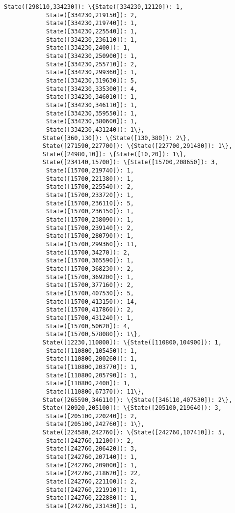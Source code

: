 \documentclass[11pt]{article}
\begin{document}
\begin{Verbatim}[commandchars=\\\{\}]
           State([298110,334230]): \{State([334230,12120]): 1,
            State([334230,219150]): 2,
            State([334230,219740]): 1,
            State([334230,225540]): 1,
            State([334230,236110]): 1,
            State([334230,2400]): 1,
            State([334230,250900]): 1,
            State([334230,255710]): 2,
            State([334230,299360]): 1,
            State([334230,319630]): 5,
            State([334230,335300]): 4,
            State([334230,346010]): 1,
            State([334230,346110]): 1,
            State([334230,359550]): 1,
            State([334230,380600]): 1,
            State([334230,431240]): 1\},
           State([360,130]): \{State([130,380]): 2\},
           State([271590,227700]): \{State([227700,291480]): 1\},
           State([24980,10]): \{State([10,20]): 1\},
           State([234140,15700]): \{State([15700,208650]): 3,
            State([15700,219740]): 1,
            State([15700,221380]): 1,
            State([15700,225540]): 2,
            State([15700,233720]): 1,
            State([15700,236110]): 5,
            State([15700,236150]): 1,
            State([15700,238090]): 1,
            State([15700,239140]): 2,
            State([15700,280790]): 1,
            State([15700,299360]): 11,
            State([15700,34270]): 2,
            State([15700,365590]): 1,
            State([15700,368230]): 2,
            State([15700,369200]): 1,
            State([15700,377160]): 2,
            State([15700,407530]): 5,
            State([15700,413150]): 14,
            State([15700,417860]): 2,
            State([15700,431240]): 1,
            State([15700,50620]): 4,
            State([15700,578080]): 1\},
           State([12230,110800]): \{State([110800,104900]): 1,
            State([110800,105450]): 1,
            State([110800,200260]): 1,
            State([110800,203770]): 1,
            State([110800,205790]): 1,
            State([110800,2400]): 1,
            State([110800,67370]): 11\},
           State([265590,346110]): \{State([346110,407530]): 2\},
           State([20920,205100]): \{State([205100,219640]): 3,
            State([205100,220240]): 2,
            State([205100,242760]): 1\},
           State([224580,242760]): \{State([242760,107410]): 5,
            State([242760,12100]): 2,
            State([242760,206420]): 3,
            State([242760,207140]): 1,
            State([242760,209000]): 1,
            State([242760,218620]): 22,
            State([242760,221100]): 2,
            State([242760,221910]): 1,
            State([242760,222880]): 1,
            State([242760,231430]): 1,

\end{Verbatim}
\end{document}
